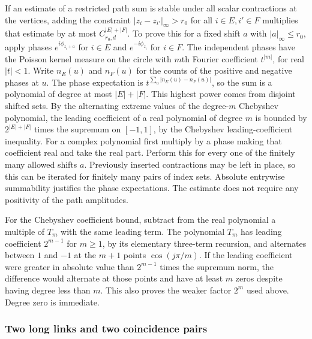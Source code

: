 \documentclass[11pt]{article}
\begin{document}
If an estimate of a restricted path sum is stable under all scalar contractions at the vertices, adding the constraint \(|z_i-z_{i'}|_\infty>r_0\) for all \(i\in E,i'\in F\) multiplies that estimate by at most \(C_{r_0,d}^{|E|+|F|}\). To prove this for a fixed shift \(a\) with \(|a|_\infty\le r_0\), apply phases \(e^{i\phi_{z_i+a}}\) for \(i\in E\) and \(e^{-i\phi_{z_i}}\) for \(i\in F\). The independent phases have the Poisson kernel measure on the circle with \(m\)th Fourier coefficient \(t^{|m|}\), for real \(|t|<1\). Write \(n_E(u)\) and \(n_F(u)\) for the counts of the positive and negative phases at \(u\). The phase expectation is \(t^{\sum_u |n_E(u)-n_F(u)|}\), so the sum is a polynomial of degree at most \(|E|+|F|\). This highest power comes from disjoint shifted sets. By the alternating extreme values of the degree-\(m\) Chebyshev polynomial, the leading coefficient of a real polynomial of degree \(m\) is bounded by \(2^{|E|+|F|}\) times the supremum on \([-1,1]\), by the Chebyshev leading-coefficient inequality. For a complex polynomial first multiply by a phase making that coefficient real and take the real part. Perform this for every one of the finitely many allowed shifts \(a\). Previously inserted contractions may be left in place, so this can be iterated for finitely many pairs of index sets. Absolute entrywise summability justifies the phase expectations. The estimate does not require any positivity of the path amplitudes.

For the Chebyshev coefficient bound, subtract from the real polynomial a multiple of \(T_m\) with the same leading term. The polynomial \(T_m\) has leading coefficient \(2^{m-1}\) for \(m\ge1\), by its elementary three-term recursion, and alternates between \(1\) and \(-1\) at the \(m+1\) points \(\cos(j\pi/m)\). If the leading coefficient were greater in absolute value than \(2^{m-1}\) times the supremum norm, the difference would alternate at those points and have at least \(m\) zeros despite having degree less than \(m\). This also proves the weaker factor \(2^m\) used above. Degree zero is immediate.

\subsubsection{Two long links and two coincidence pairs}\label{two-long-links-and-two-coincidence-pairs}
\end{document}
